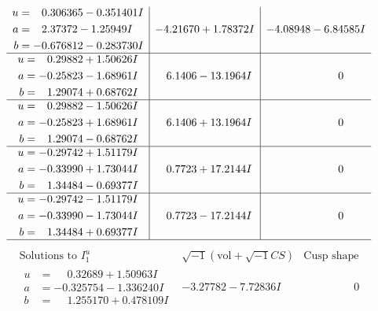 \documentclass[1p]{elsarticle_modified}
\theoremstyle{definition}
\newcommand{\I}{\sqrt{-1}}
\begin{document}
$$\begin{array}{c|c|c}
\begin{aligned}
u &= \phantom{-}0.306365 - 0.351401 I \\
a &= \phantom{-}2.37372 - 1.25949 I \\
b &= -0.676812 - 0.283730 I\end{aligned}
 & -4.21670 + 1.78372 I & -4.08948 - 6.84585 I \\ \hline\begin{aligned}
u &= \phantom{-}0.29882 + 1.50626 I \\
a &= -0.25823 - 1.68961 I \\
b &= \phantom{-}1.29074 + 0.68762 I\end{aligned}
 & \phantom{-}6.1406 - 13.1964 I & \phantom{-0.000000 } 0 \\ \hline\begin{aligned}
u &= \phantom{-}0.29882 - 1.50626 I \\
a &= -0.25823 + 1.68961 I \\
b &= \phantom{-}1.29074 - 0.68762 I\end{aligned}
 & \phantom{-}6.1406 + 13.1964 I & \phantom{-0.000000 } 0 \\ \hline\begin{aligned}
u &= -0.29742 + 1.51179 I \\
a &= -0.33990 + 1.73044 I \\
b &= \phantom{-}1.34484 - 0.69377 I\end{aligned}
 & \phantom{-}0.7723 + 17.2144 I & \phantom{-0.000000 } 0 \\ \hline\begin{aligned}
u &= -0.29742 - 1.51179 I \\
a &= -0.33990 - 1.73044 I \\
b &= \phantom{-}1.34484 + 0.69377 I\end{aligned}
 & \phantom{-}0.7723 - 17.2144 I & \phantom{-0.000000 } 0\\
 \hline 
 \end{array}$$\newpage$$\begin{array}{c|c|c}  
\text{Solutions to }I^u_{1}& \I (\text{vol} + \sqrt{-1}CS) & \text{Cusp shape}\\
 \hline 
\begin{aligned}
u &= \phantom{-}0.32689 + 1.50963 I \\
a &= -0.325754 - 1.336240 I \\
b &= \phantom{-}1.255170 + 0.478109 I\end{aligned}
 & -3.27782 - 7.72836 I & \phantom{-0.000000 } 0 \\ \hline\begin{aligned}

\end{aligned}
\end{array}$$
\end{document}
